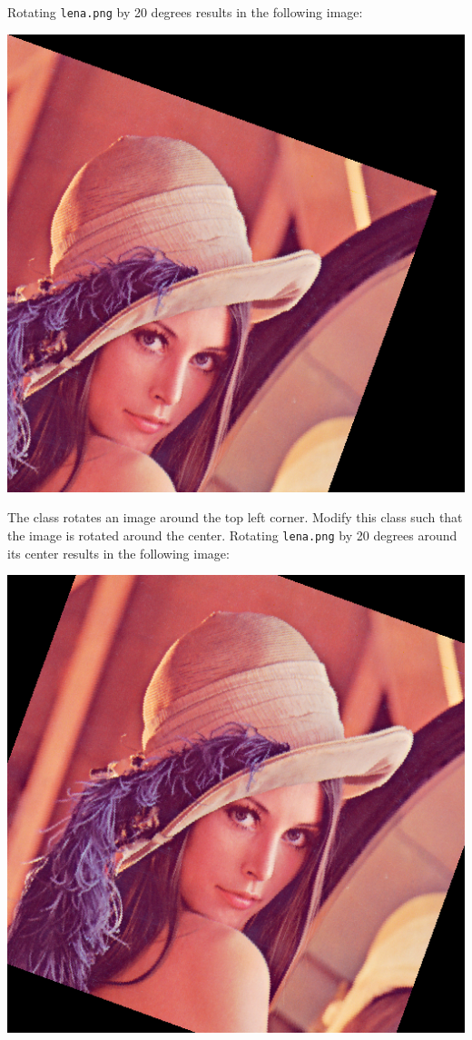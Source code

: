 \documentclass{book}
\begin{document}
\begin{exercise}
Rotating \texttt{lena.png} by 20 degrees results in the following image:
\begin{center}
\includegraphics[scale=0.2]{lena-rotated-20.png}
\end{center} 
\end{exercise}

\begin{exercise}
The class  rotates an image around the top left corner. Modify this class such that the image is rotated around the center. Rotating \texttt{lena.png} by 20 degrees around its center results in the following image:
\begin{center}
\includegraphics[scale=0.2]{lena-rotated-center-20.png}
\end{center} 
\end{exercise}
\end{document}
